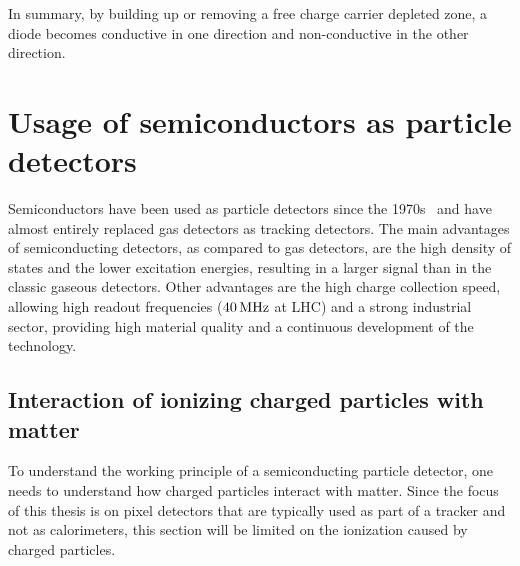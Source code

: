 In summary, by building up or removing a free charge carrier depleted zone, a diode becomes conductive in one direction and non-conductive in the other direction.

\section{Usage of semiconductors as particle detectors}
Semiconductors have been used as particle detectors since the 1970s~\cite{Lut99} and have almost entirely replaced gas detectors as tracking detectors. The main advantages of semiconducting detectors, as compared to gas detectors, are the high density of states and the lower excitation energies, resulting in a larger signal than in the classic gaseous detectors. Other advantages are the high charge collection speed, allowing high readout frequencies ($40\,\rm{MHz}$ at \ac{LHC}) and a strong industrial sector, providing high material quality and a continuous development of the technology.


\subsection{Interaction of ionizing charged particles with matter}
To understand the working principle of a semiconducting particle detector, one needs to understand how charged particles interact with matter. Since the focus of this thesis is on pixel detectors that are typically used as part of a tracker and not as calorimeters, this section will be limited on the ionization caused by charged particles.

